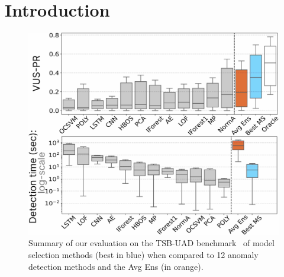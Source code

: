 \section{Introduction}

\begin{figure}
    \centering
    \includegraphics[width=1\linewidth]{figures/Fig1.jpg}
    \caption{Summary of our evaluation on the TSB-UAD benchmark~\cite{10.14778/3529337.3529354} of model selection methods (best in blue) when compared to 12 anomaly detection methods and the Avg Ens (in orange).}
    \label{fig:intro_fig}
\end{figure}

